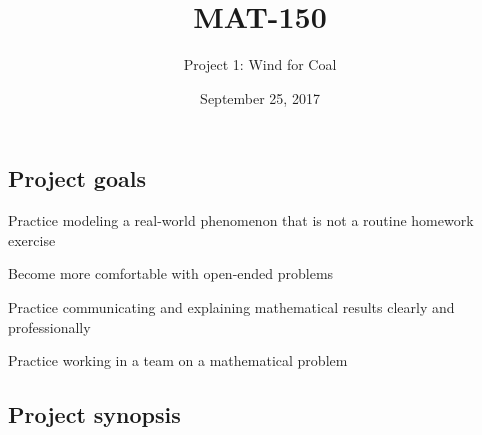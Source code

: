 \documentclass[11pt]{article}
\title{MAT-150}
\author{Project 1: Wind for Coal}
\date{September 25, 2017}
\begin{document}


\thispagestyle{empty}
\maketitle
\thispagestyle{empty} \pagestyle{empty}




\subsection*{Project goals}
\vspace{-2.8ex}
\begin{compactitem}
    \item Practice modeling a real-world phenomenon that is not a routine
        homework exercise
    \item Become more comfortable with open-ended problems
    \item Practice communicating and explaining mathematical results clearly
        and professionally
    \item Practice working in a team on a mathematical problem
\end{compactitem}

\subsection*{Project synopsis}
\vspace{-2.8ex}
\end{document}
